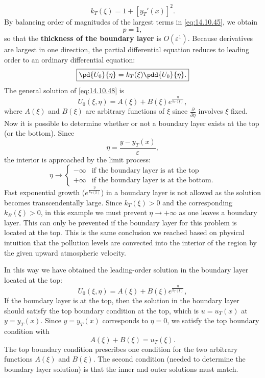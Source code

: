 \begin{equation}
k_T(\xi) = 1 + [y_T'(x)]^2.
\label{eq:14.10.46}
\end{equation}
By balancing order of magnitudes of the largest terms in \eqref{eq:14.10.45}, we obtain
\begin{equation}
p = 1,
\label{eq:14.10.47}
\end{equation}
so that the \textbf{thickness of the boundary layer} is $O(\varepsilon^1)$. Because derivatives are largest in one direction, the partial differential equation reduces to leading order to an ordinary differential equation:
\begin{equation}
\boxed{\pd{U_0}{\eta} = k_T(\xi)\pdd{U_0}{\eta}.}
\label{eq:14.10.48}
\end{equation}
The general solution of \eqref{eq:14.10.48} is
\begin{equation}
U_0(\xi, \eta) = A(\xi) + B(\xi)e^{\frac{\eta}{k_T(\xi)}},
\label{eq:14.10.49}
\end{equation}
where $A(\xi)$ and $B(\xi)$ are arbitrary functions of $\xi$ since $\frac{\partial}{\partial \eta}$ involves $\xi$ fixed. Now it is possible to determine whether or not a boundary layer exists at the top (or the bottom). Since
\begin{equation}
\eta = \frac{y - y_T(x)}{\varepsilon},
\label{eq:14.10.50}
\end{equation}
the interior is approached by the limit process:
\[
\eta \to \begin{cases} -\infty & \text{if the boundary layer is at the top} \\ +\infty & \text{if the boundary layer is at the bottom.} \end{cases}
\]
Fast exponential growth ($e^{\frac{\eta}{k_T(\xi)}}$) in a boundary layer is not allowed as the solution becomes transcendentally large. Since $k_T(\xi) > 0$ and the corresponding $k_B(\xi) > 0$, in this example we must prevent $\eta \to +\infty$ as one leaves a boundary layer. This can only be prevented if the boundary layer for this problem is located at the top. This is the same conclusion we reached based on physical intuition that the pollution levels are convected into the interior of the region by the given upward atmospheric velocity.

In this way we have obtained the leading-order solution in the boundary layer located at the top:
\begin{equation}
U_0(\xi, \eta) = A(\xi) + B(\xi)e^{\frac{\eta}{k_T(\xi)}},
\label{eq:14.10.51}
\end{equation}
If the boundary layer is at the top, then the solution in the boundary layer should satisfy the top boundary condition at the top, which is $u = u_T(x)$ at $y = y_T(x)$. Since $y = y_T(x)$ corresponds to $\eta = 0$, we satisfy the top boundary condition with
\begin{equation}
A(\xi) + B(\xi) = u_T(\xi).
\label{eq:14.10.52}
\end{equation}
The top boundary condition prescribes one condition for the two arbitrary functions $A(\xi)$ and $B(\xi)$. The second condition (needed to determine the boundary layer solution) is that the inner and outer solutions must match.

